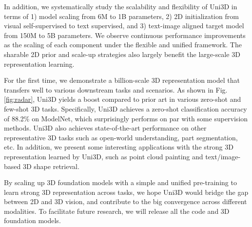 \documentclass{article} \usepackage{iclr2024_conference,times}
\def\Ours{Uni3D\xspace}
\begin{document}
In addition, we systematically study the scalability and flexibility of \Ours in terms of 1) model scaling from 6M to 1B parameters, 2) 2D initialization from visual self-supervised to text supervised, and 3) text-image aligned target model from 150M to 5B parameters.
We observe continuous performance improvements as the scaling of each component under the flexible and unified framework.
The sharable 2D prior and scale-up strategies also largely benefit the large-scale 3D representation learning.

For the first time, we demonstrate a billion-scale 3D representation model that transfers well to various downstream tasks and scenarios.
As shown in Fig. \ref{fig:radar}, \Ours yields a boost compared to prior art in various zero-shot and few-shot 3D tasks.
Specifically, \Ours achieves a zero-shot classification accuracy of 88.2\% on ModelNet, which surprisingly performs on par with some supervision methods. 
\Ours also achieves state-of-the-art performance on other representative 3D tasks such as open-world understanding, part segmentation, etc.
In addition, we present some interesting applications with the strong 3D representation learned by \Ours, such as point cloud painting and text/image-based  3D shape retrieval. 

By scaling up 3D foundation models with a simple and unified pre-training to learn strong 3D representation across tasks, we hope \Ours would bridge the gap between 2D and 3D vision, and contribute to the big convergence across different modalities. To facilitate future research, we will release all the code and 3D foundation models.
\end{document}
